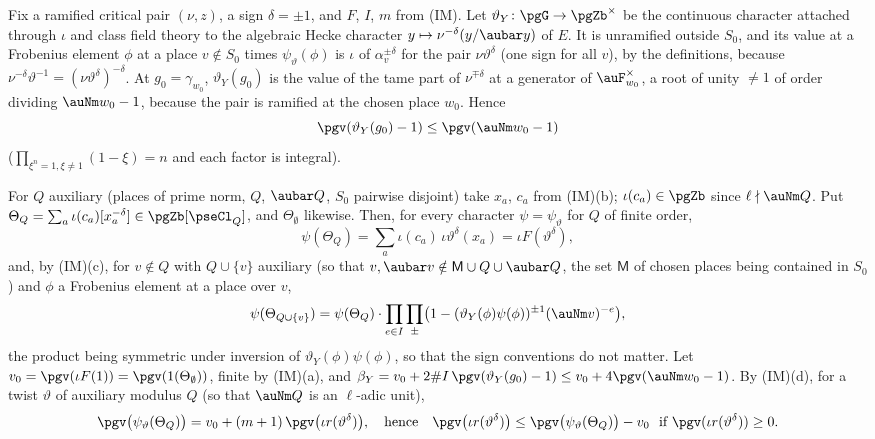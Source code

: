 \documentclass[10pt]{amsart}
\theoremstyle{definition}
\theoremstyle{remark}
\begin{document}
Fix a ramified critical pair $(\nu,z)$, a sign $\delta=\pm1$, and $F$, $I$, $m$ from (IM). Let
$\vartheta_Y\colon\pgG\to\pgZb^\times$ be the continuous character attached through $\iota$ and class
field theory to the algebraic Hecke character $y\mapsto\nu^{-\delta}(y/\aubar y)$ of $E$. It is
unramified outside $S_0$, and its value at a Frobenius element $\phi$ at a place $v\notin S_0$ times
$\psi_\vartheta(\phi)$ is $\iota$ of $\alpha_v^{\pm\delta}$ for the pair $\nu\vartheta^{\delta}$ (one sign for
all $v$), by the definitions, because $\nu^{-\delta}\vartheta^{-1}=(\nu\vartheta^{\delta})^{-\delta}$. At $g_0=\gamma_{w_0}$, $\vartheta_Y(g_0)$ is the value of the tame part
of $\nu^{\mp\delta}$ at a generator of $\auF_{w_0}^\times$, a root of unity $\ne1$ of order dividing
$\auNm w_0-1$, because the pair is ramified at the chosen place $w_0$. Hence
\begin{equation}\label{pse:eq-g0}
\pgv(\vartheta_Y(g_0)-1)\le\pgv(\auNm w_0-1)
\end{equation}
($\prod_{\xi^n=1,\xi\ne1}(1-\xi)=n$ and each factor is integral).

For $Q$ auxiliary (places of prime norm, $Q$, $\aubar Q$, $S_0$ pairwise disjoint) take $x_a$,
$c_a$ from (IM)(b); $\iota(c_a)\in\pgZb$ since $\ell\nmid\auNm Q$. Put $\Theta_Q=\sum_a\iota(c_a)
[x_a^{-\delta}]\in\pgZb[\pseCl_Q]$, and $\Theta_\emptyset$ likewise. Then, for every character
$\psi=\psi_\vartheta$ for $Q$ of finite order,
\[
\psi(\Theta_Q)=\sum_a\iota(c_a)\,\iota\vartheta^{\delta}(x_a)=\iota F(\vartheta^\delta),
\]
and, by (IM)(c), for $v\notin Q$ with $Q\cup\{v\}$ auxiliary (so that $v,\aubar v\notin\mathsf M\cup
Q\cup\aubar Q$, the set $\mathsf M$ of chosen places being contained in $S_0$) and $\phi$ a Frobenius element at a
place over $v$,
\begin{equation}\label{pse:eq-norm}
\psi(\Theta_{Q\cup\{v\}})=\psi(\Theta_Q)\cdot\prod_{e\in I}\prod_\pm\bigl(1-(\vartheta_Y(\phi)
\psi(\phi))^{\pm1}(\auNm v)^{-e}\bigr),
\end{equation}
the product being symmetric under inversion of $\vartheta_Y(\phi)\psi(\phi)$, so that the sign
conventions do not matter. Let $v_0=\pgv(\iota F(1))=\pgv(1(\Theta_\emptyset))$, finite by (IM)(a),
and $\beta_Y=v_0+2\#I\,\pgv(\vartheta_Y(g_0)-1)\le v_0+4\pgv(\auNm w_0-1)$. By (IM)(d), for a twist
$\vartheta$ of auxiliary modulus $Q$ (so that $\auNm Q$ is an $\ell$-adic unit),
\begin{equation}\label{pse:eq-ratio}
\pgv\bigl(\psi_\vartheta(\Theta_Q)\bigr)=v_0+(m+1)\,\pgv\bigl(\iota r(\vartheta^\delta)\bigr),
\quad\text{hence}\quad \pgv\bigl(\iota r(\vartheta^{\delta})\bigr)\le\pgv\bigl(\psi_\vartheta(\Theta_Q)
\bigr)-v_0\ \text{ if }\pgv(\iota r(\vartheta^\delta))\ge0 .
\end{equation}
\end{document}
